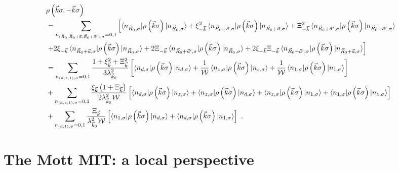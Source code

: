 \documentclass{report}
\numberwithin{equation}{section}
\begin{document}
\begin{equation}\begin{aligned}
	&\rho\left(\vec k \sigma, -\vec k \sigma\right) \\
	&= \sum_{n_{(\vec R_0,\vec R_0 + \vec a,\vec R_0  +\vec a^\prime),\sigma}=0,1}\left[\braket{n_{\vec R_0,\sigma}| \rho\left(\vec k\sigma\right) | n_{\vec R_0, \sigma}} + \xi_{-\vec k}^2\braket{n_{\vec R_0 + \vec a,\sigma}| \rho\left(\vec k\sigma\right) | n_{\vec R_0 + \vec a, \sigma}} + \Xi_{-\vec k}^2\braket{n_{\vec R_0 + \vec a^\prime,\sigma}| \rho\left(\vec k\sigma\right) | n_{\vec R_0 + \vec a^\prime, \sigma}} \right.\\
	&\left.+ 2\xi_{-\vec k}\braket{n_{\vec R_0 + \vec a,\sigma}| \rho\left(\vec k\sigma\right) | n_{\vec R_0, \sigma}} + 2\Xi_{-\vec k}\braket{n_{\vec R_0 + \vec a^\prime,\sigma}| \rho\left(\vec k\sigma\right) | n_{\vec R_0, \sigma}} + 2\xi_{-\vec k}\Xi_{-\vec k}\braket{n_{\vec R_0 + \vec a^\prime,\sigma}| \rho\left(\vec k\sigma\right) | n_{\vec R_0 + \vec a, \sigma}}\right]\\
	&= \sum_{n_{(d,z,1),\sigma}=0,1}\frac{1 + \xi_{\vec k}^2 + \Xi_{\vec k}^2}{3\lambda_{\vec k_0}^2}\left[\braket{n_{d,\sigma} | \rho\left(\vec k\sigma\right) | n_{d,\sigma}} + \frac{1}{\mathcal{W}}\braket{n_{z,\sigma} | \rho\left(\vec k\sigma\right) | n_{z,\sigma}} + \frac{1}{\mathcal{W}}\braket{n_{1,\sigma} | \rho\left(\vec k\sigma\right) | n_{1,\sigma}}\right] \\
				       &+ \sum_{n_{(d,z,1),\sigma}=0,1}\frac{\xi_{\vec k}\left(1 + \Xi_{\vec k}\right)}{2\lambda_{\vec k_0}^2 \mathcal{W}}\left[\braket{n_{d,\sigma} | \rho\left(\vec k\sigma\right) | n_{z,\sigma}} + \braket{n_{z,\sigma} | \rho\left(\vec k\sigma\right) | n_{d,\sigma}} + \braket{n_{z,\sigma} | \rho\left(\vec k\sigma\right) | n_{1,\sigma}} + \braket{n_{1,\sigma} | \rho\left(\vec k\sigma\right) | n_{z,\sigma}} \right]\\
				       &+ \sum_{n_{(d,1),\sigma}=0,1}\frac{\Xi_{\vec k}}{\lambda_{\vec k_0}^2 \mathcal{W}}\left[\braket{n_{1,\sigma} | \rho\left(\vec k\sigma\right) | n_{d,\sigma}} + \braket{n_{d,\sigma} | \rho\left(\vec k\sigma\right) | n_{1,\sigma}}\right]~.
\end{aligned}\end{equation}


\section{The Mott MIT: a local perspective}
\end{document}
